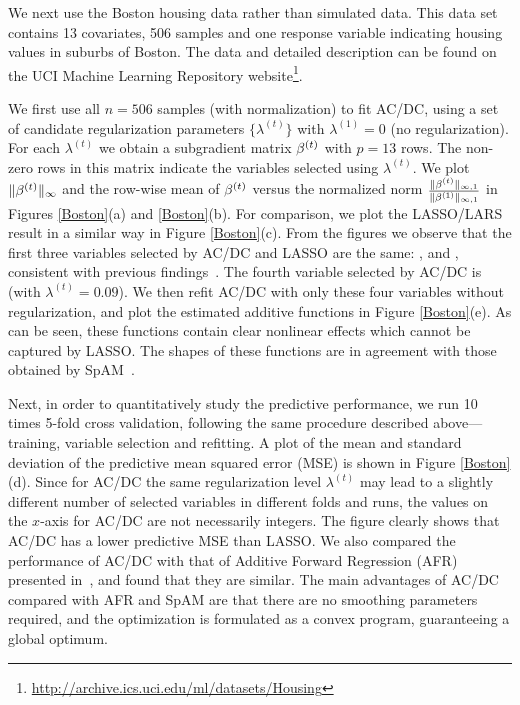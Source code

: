 
We next use the Boston housing data rather than simulated data. This data set
contains 13 covariates, 506 samples and one response variable
indicating housing values in suburbs of Boston. The data and detailed description
can be found on the UCI Machine Learning Repository website\footnote{\url{http://archive.ics.uci.edu/ml/datasets/Housing}}. 

We first use all $n=506$ samples (with normalization) to fit AC/DC,
using a set of candidate regularization parameters $\{\lambda^{(t)}\}$
with $\lambda^{(1)}=0$ (no regularization). For each $\lambda^{(t)}$
we obtain a subgradient matrix $\beta^{(t)}$ with $p=13$
rows. The non-zero rows in this matrix indicate the variables selected
using $\lambda^{(t)}$.  We plot $\|\beta^{(t)}\|_{\infty}$ and
the row-wise mean of $\beta^{(t)}$ versus the normalized norm
$\frac{\|\beta^{(t)}\|_{\infty,1}}{\|\beta^{(1)}\|_{\infty,1}}$
in Figures \ref{Boston}(a) and \ref{Boston}(b).  For comparison, we
plot the LASSO/LARS result in a similar way in Figure \ref{Boston}(c).
From the figures we observe that the first three variables selected by
AC/DC and LASSO are the same: ,  and ,
consistent with previous findings~\citep{SpAM:07}.  The fourth
variable selected by AC/DC is  (with $\lambda^{(t)}=0.09$).
We then refit AC/DC with only these four variables without
regularization, and plot the estimated additive functions in Figure
\ref{Boston}(e). As can be seen, these functions contain clear
nonlinear effects which cannot be captured by LASSO. The shapes of
these functions are in agreement with those obtained by
SpAM~\citep{SpAM:07}.

Next, in order to quantitatively study the predictive performance, we
run 10 times 5-fold cross validation, following the same procedure
described above---training, variable selection and refitting.  A plot
of the mean and standard deviation of the predictive mean squared
error (MSE) is shown in Figure \ref{Boston}(d). Since for AC/DC the same
regularization level $\lambda^{(t)}$ may lead to a slightly different number of selected
variables in different folds and runs, the values on the $x$-axis
for AC/DC are not necessarily integers. The figure clearly shows that AC/DC has a 
lower predictive MSE than LASSO.  We also compared the performance of
AC/DC with that of Additive Forward Regression (AFR) presented
in~\cite{Xi:09}, and found that they are similar.  The main advantages
of AC/DC compared with AFR and SpAM are that there are no smoothing
parameters required, and the optimization is formulated
as a convex program, guaranteeing a global optimum.

